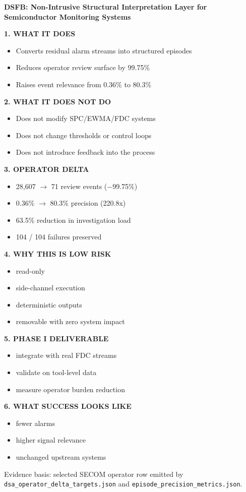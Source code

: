 \clearpage
\thispagestyle{plain}
\begingroup
\small
\setlength{\parindent}{0pt}

\begin{center}
{\Large\bfseries DSFB: Non-Intrusive Structural Interpretation Layer for Semiconductor Monitoring Systems}
\end{center}

\textbf{1. WHAT IT DOES}
\begin{itemize}
  \item Converts residual alarm streams into structured episodes
  \item Reduces operator review surface by 99.75\%
  \item Raises event relevance from 0.36\% to 80.3\%
\end{itemize}

\textbf{2. WHAT IT DOES NOT DO}
\begin{itemize}
  \item Does not modify SPC/EWMA/FDC systems
  \item Does not change thresholds or control loops
  \item Does not introduce feedback into the process
\end{itemize}

\textbf{3. OPERATOR DELTA}
\begin{itemize}
  \item 28{,}607 $\rightarrow$ 71 review events ($-$99.75\%)
  \item 0.36\% $\rightarrow$ 80.3\% precision (220.8x)
  \item 63.5\% reduction in investigation load
  \item 104 / 104 failures preserved
\end{itemize}

\textbf{4. WHY THIS IS LOW RISK}
\begin{itemize}
  \item read-only
  \item side-channel execution
  \item deterministic outputs
  \item removable with zero system impact
\end{itemize}

\textbf{5. PHASE I DELIVERABLE}
\begin{itemize}
  \item integrate with real FDC streams
  \item validate on tool-level data
  \item measure operator burden reduction
\end{itemize}

\textbf{6. WHAT SUCCESS LOOKS LIKE}
\begin{itemize}
  \item fewer alarms
  \item higher signal relevance
  \item unchanged upstream systems
\end{itemize}

\vfill
\footnotesize
Evidence basis: selected SECOM operator row emitted by
\texttt{dsa\_operator\_delta\_targets.json} and
\texttt{episode\_precision\_metrics.json}.
\par
\endgroup
